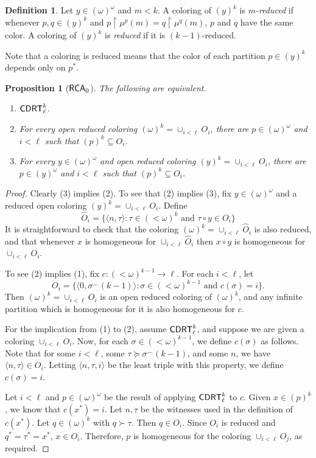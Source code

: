 \documentclass{amsart}
\newtheorem{prop}[thm]{Proposition}
\theoremstyle{definition}
\newtheorem{defn}[thm]{Definition}
\theoremstyle{remark}
\newcommand{\system}[1]{\mbox{\fontfamily{cmss}\fontshape{n}\fontseries{m}%
    \selectfont#1}}
\newcommand{\RCA}{\system{RCA}\ensuremath{_0}}
\newcommand{\CDRT}{\system{CDRT}}
\newcommand{\restrict}{\upharpoonright}
\begin{document}
\begin{defn}
\label{reduced-coloring} 
Let $y \in (\omega)^\omega$ and $m< k$.  A coloring of $(y)^k$ is
\emph{$m$-reduced} if whenever $p,q \in (y)^k$ and $p\restrict
\mu^p(m) = q\restrict \mu^q(m)$, $p$ and $q$ have the same color.
A coloring of $(y)^k$ is \emph{reduced} if it is $(k-1)$-reduced.
\end{defn}  

Note that a coloring is reduced means that the color of 
each partition $p \in (y)^k$ depends only on $p^\ast$.


\begin{prop}[$\RCA$]
\label{prop:2.2}
The following are equivalent.
\begin{enumerate}
\item $\CDRT^k_\ell$.
\item For every open reduced coloring $(\omega)^k=\cup_{i<\ell} O_i$,
there are $p\in(\omega)^\omega$ and $i<\ell$ such that $(p)^k \subseteq O_i$.
\item For every $y \in (\omega)^{\omega}$ and open reduced coloring $(y)^k = \cup_{i<\ell} O_i$, there
  are $p\in(y)^\omega$ and $i<\ell$ such that  $(p)^k\subseteq O_i$.
\end{enumerate}
\end{prop}

\begin{proof}  Clearly (3) implies (2).  To see that (2) implies (3), fix $y \in (\omega)^{\omega}$ and 
a reduced open coloring $(y)^k = \cup_{i<\ell} O_i$. 
Define 
$$\widehat{O}_i = \{ \langle n, \tau\rangle : \tau \in (<\omega)^k \text{ and } 
\tau \circ y \in O_i\}$$
 It is straightforward to check that the coloring $(\omega)^k = \cup_{i < \ell} \widehat{O}_i$ 
is also reduced, and that whenever $x$ is homogeneous for $\cup_{i<\ell} \widehat{O}_i$
then $x\circ y$ is homogeneous for $\cup_{i<\ell} O_i$.


To see (2) implies (1), fix $c:(<\omega)^{k-1}\rightarrow \ell$. For each $i < \ell$, let
\[
O_i = \{\langle 0, \sigma^{\smallfrown}(k-1)\rangle : \sigma \in(<\omega)^{k-1} \text{ and }  c(\sigma) = i \}.
\]
Then $(\omega)^k = \cup_{i < \ell} O_i$ is an open 
reduced coloring of $(\omega)^k$, and any infinite partition 
which is homogeneous for it is also homogeneous for $c$. 


For the implication from (1) to (2), assume $\CDRT^k_\ell$, 
and suppose we are given a coloring $\cup_{i<\ell} O_i$.
Now, for each $\sigma\in (<\omega)^{k-1}$, we 
define $c(\sigma)$ as follows.  Note that for some $i<\ell$, some 
$\tau\succeq \sigma^\smallfrown(k-1)$, and some $n$, 
we have $\langle n, \tau \rangle \in O_i$.  Letting $\langle n, \tau, i\rangle$
be the least triple with this property, we define $c(\sigma)=i$.

Let $i < \ell$ and $p \in (\omega)^{\omega}$ be the result of 
applying $\CDRT^k_\ell$ to $c$.  Given $x \in (p)^k$, we 
know that $c(x^\ast) = i$.  Let $n, \tau$ be the witnesses used 
in the definition of $c(x^\ast)$.  Let $q \in (\omega)^k$ with 
$q \succ \tau$.  Then $q \in O_i$.  Since $O_i$ 
is reduced and $q^\ast = \tau^\ast = x^\ast$, $x \in O_i$.
Therefore, $p$ is homogeneous for the coloring $\cup_{i<\ell} O_j$, 
as required.
\end{proof}
\end{document}
